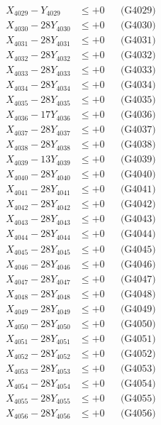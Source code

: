 \documentclass[a4paper,10pt]{article}
\begin{document}
{\begin{align}
X_{4029} - Y_{4029} &\leq +0 && \text{(G4029)} \\
X_{4030} - 28Y_{4030} &\leq +0 && \text{(G4030)} \\
\allowbreak
X_{4031} - 28Y_{4031} &\leq +0 && \text{(G4031)} \\
X_{4032} - 28Y_{4032} &\leq +0 && \text{(G4032)} \\
X_{4033} - 28Y_{4033} &\leq +0 && \text{(G4033)} \\
X_{4034} - 28Y_{4034} &\leq +0 && \text{(G4034)} \\
X_{4035} - 28Y_{4035} &\leq +0 && \text{(G4035)} \\
X_{4036} - 17Y_{4036} &\leq +0 && \text{(G4036)} \\
X_{4037} - 28Y_{4037} &\leq +0 && \text{(G4037)} \\
X_{4038} - 28Y_{4038} &\leq +0 && \text{(G4038)} \\
X_{4039} - 13Y_{4039} &\leq +0 && \text{(G4039)} \\
X_{4040} - 28Y_{4040} &\leq +0 && \text{(G4040)} \\
\allowbreak
X_{4041} - 28Y_{4041} &\leq +0 && \text{(G4041)} \\
X_{4042} - 28Y_{4042} &\leq +0 && \text{(G4042)} \\
X_{4043} - 28Y_{4043} &\leq +0 && \text{(G4043)} \\
X_{4044} - 28Y_{4044} &\leq +0 && \text{(G4044)} \\
X_{4045} - 28Y_{4045} &\leq +0 && \text{(G4045)} \\
X_{4046} - 28Y_{4046} &\leq +0 && \text{(G4046)} \\
X_{4047} - 28Y_{4047} &\leq +0 && \text{(G4047)} \\
X_{4048} - 28Y_{4048} &\leq +0 && \text{(G4048)} \\
X_{4049} - 28Y_{4049} &\leq +0 && \text{(G4049)} \\
X_{4050} - 28Y_{4050} &\leq +0 && \text{(G4050)} \\
\allowbreak
X_{4051} - 28Y_{4051} &\leq +0 && \text{(G4051)} \\
X_{4052} - 28Y_{4052} &\leq +0 && \text{(G4052)} \\
X_{4053} - 28Y_{4053} &\leq +0 && \text{(G4053)} \\
X_{4054} - 28Y_{4054} &\leq +0 && \text{(G4054)} \\
X_{4055} - 28Y_{4055} &\leq +0 && \text{(G4055)} \\
X_{4056} - 28Y_{4056} &\leq +0 && \text{(G4056)} \\

\end{align}}
\end{document}
